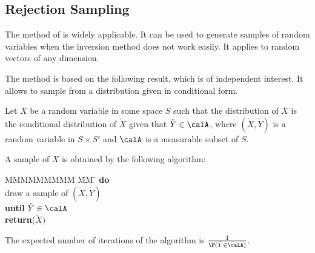 \subsection{Rejection Sampling}
\label{sec-rej-samp}

The method of  is widely
applicable. It can be used to generate samples of
random variables when the inversion method does
not work easily. It applies to random vectors of
any dimension.

The method is based on the following result, which is of
independent interest. It allows to sample from a distribution
given in conditional form.
\begin{shadethm}
 Let $X$ be a random variable in some space $S$
such that the distribution of $X$ is the conditional distribution
of $\tilde{X}$ given that $\tilde{Y}\in \calA$, where
$(\tilde{X},\tilde{Y})$ is a random variable in $S \times S'$ and
$\calA$ is a measurable subset of $S$.

A sample of $X$ is obtained by the following algorithm:
\begin{tabbing}
  MMMMMMMMM \= MM \=  \kill
  \>\textbf{do}  \\
  \>  \> draw a sample of  $(\tilde{X},\tilde{Y})$   \\
  \>\textbf{until} $\tilde{Y} \in \calA$ \\
  \>\textbf{return}($\tilde{X})$
\end{tabbing}

The expected number of iterations of the algorithm is
$\frac{1}{\P(\tilde{Y}\in \calA)}$. \label{theo-simul-rs}
\end{shadethm}


